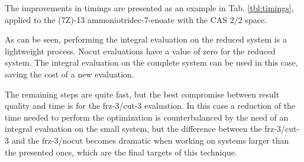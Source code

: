 

The improvements in timings are presented as an example in Tab. \ref{tbl:timings},
applied to the (7Z)-13 ammoniotridec-7-enoate with the CAS 2/2 space.

As can be seen, performing the integral evaluation on the reduced
system is a lightweight process.
Nocut evaluations have a value of zero for the reduced system. The integral
evaluation on the complete system can be used in this case, saving the cost
of a new evaluation.

The remaining steps are quite fast, but the best compromise between result
quality and time is for the frz-3/cut-3 evaluation.
In this case a reduction of the time needed to perform the optimization is
counterbalanced by the need of an integral evaluation on the small system,
but the difference between the frz-3/cut-3 and the frz-3/nocut becomes
dramatic when working on systems larger than the presented ones, which are
the final targets of this technique.



